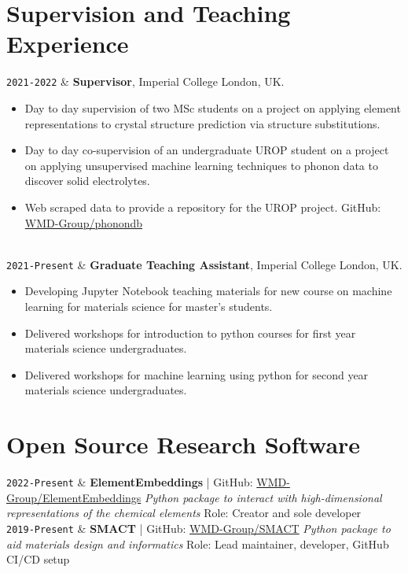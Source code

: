 \documentclass[11pt,a4paper]{article}
\newcommand{\ICL}{Imperial College London}
\newcommand{\Duration}[2]{\fontsize{10pt}{0}\selectfont \texttt{#1-#2}}
\newcommand{\Ongoing}{Present}
\newcommand{\GitHub}[1]{\faGithub{} GitHub: \href{https://github.com/#1}{#1}}
\begin{document}
\section{Supervision and Teaching Experience}

\begin{EntriesTableDuration}
  \Duration{2021}{2022} & \textbf{Supervisor}, \ICL{}, UK.
  \begin{itemize}
    \item Day to day supervision of two MSc students on a project on applying element representations to crystal structure prediction via structure substitutions.
    \item Day to day co-supervision of an undergraduate UROP student on a project on applying unsupervised machine learning techniques to phonon data to discover solid electrolytes. 
    \item Web scraped data to provide a repository for the UROP project. \GitHub{WMD-Group/phonondb} 
  \end{itemize}
  \\
  \Duration{2021}{\Ongoing} & \textbf{Graduate Teaching Assistant}, \ICL{}, UK.
  \begin{itemize}
    \item Developing Jupyter Notebook teaching materials for new course on machine learning for materials science for master's students.
    \item Delivered workshops for introduction to python courses for first year materials science undergraduates.
    \item Delivered workshops for machine learning using python for second year materials science undergraduates.
  \end{itemize}
\end{EntriesTableDuration}

\section{Open Source Research Software}

\begin{EntriesTableDuration}
  \Duration{2022}{\Ongoing} &
  \textbf{ElementEmbeddings} | \GitHub{WMD-Group/ElementEmbeddings}
  \newline
  \textit{Python package to interact with high-dimensional representations of the chemical elements}
  \newline
  Role: Creator and sole developer
  \\
  \Duration{2019}{\Ongoing} &
  \textbf{SMACT} | \GitHub{WMD-Group/SMACT}
  \newline
  \textit{Python package to aid materials design and informatics}
  \newline
  Role: Lead maintainer, developer, GitHub CI/CD setup
\end{EntriesTableDuration}
\end{document}
